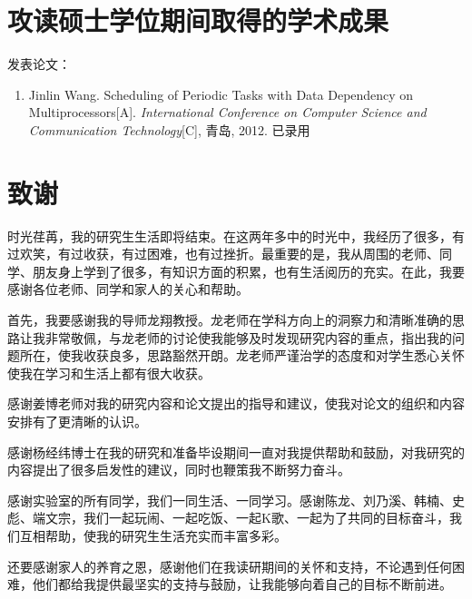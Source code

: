 ﻿%

\chapter{攻读硕士学位期间取得的学术成果}
\noindent 发表论文：

\begin{enumerate}
  \item Jinlin Wang. Scheduling of Periodic Tasks with Data Dependency on Multiprocessors[A]. {\em International Conference on Computer Science and Communication Technology}[C], 青岛, 2012. 已录用
\end{enumerate}



%
%
%


%
%


\chapter{致谢}

时光荏苒，我的研究生生活即将结束。在这两年多中的时光中，我经历了很多，有过欢笑，有过收获，有过困难，也有过挫折。最重要的是，我从周围的老师、同学、朋友身上学到了很多，有知识方面的积累，也有生活阅历的充实。在此，我要感谢各位老师、同学和家人的关心和帮助。

首先，我要感谢我的导师龙翔教授。龙老师在学科方向上的洞察力和清晰准确的思路让我非常敬佩，与龙老师的讨论使我能够及时发现研究内容的重点，指出我的问题所在，使我收获良多，思路豁然开朗。龙老师严谨治学的态度和对学生悉心关怀使我在学习和生活上都有很大收获。

感谢姜博老师对我的研究内容和论文提出的指导和建议，使我对论文的组织和内容安排有了更清晰的认识。

感谢杨经纬博士在我的研究和准备毕设期间一直对我提供帮助和鼓励，对我研究的内容提出了很多启发性的建议，同时也鞭策我不断努力奋斗。

感谢实验室的所有同学，我们一同生活、一同学习。感谢陈龙、刘乃溪、韩楠、史彪、端文宗，我们一起玩闹、一起吃饭、一起K歌、一起为了共同的目标奋斗，我们互相帮助，使我的研究生生活充实而丰富多彩。

还要感谢家人的养育之恩，感谢他们在我读研期间的关怀和支持，不论遇到任何困难，他们都给我提供最坚实的支持与鼓励，让我能够向着自己的目标不断前进。
